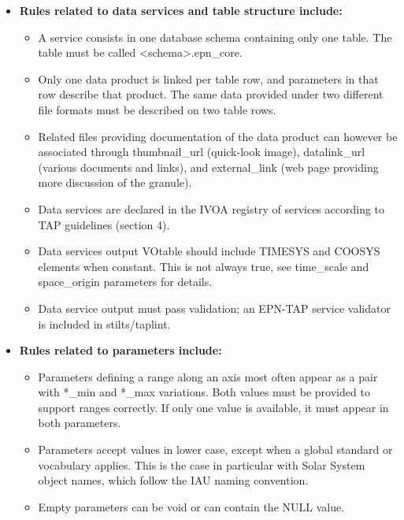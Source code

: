 \documentclass[11pt,a4paper]{ivoa}
\begin{document}
\begin{itemize}
\item \textbf{Rules related to data services and table structure include:}

\begin{itemize}
\item 
A service consists in one database schema containing only one table. The table must be called <schema>.epn\_core. 

\item Only one data product is linked per table row, and parameters in that row describe that product. The same data provided under two different file formats must be described on two table rows.

\item Related files providing documentation of the data product can however be associated through thumbnail\_{url} (quick-look image), datalink\_url (various documents and links), and external\_link (web page providing more discussion of the granule).

\item Data services are declared in the IVOA registry of services according to TAP guidelines (section 4).

\item Data services output VOtable should include TIMESYS and COOSYS elements when constant. This is not always true, see time\_scale  and space\_origin parameters for details.

\item Data service output must pass validation; an EPN-TAP service validator is included in stilts/taplint.
\end{itemize}


\item \textbf{Rules related to parameters include:}

\begin{itemize}
\item Parameters defining a range along an axis most often appear as a pair with *\_min and *\_max variations.
Both values must be provided to support ranges correctly. If only one value is available, it must appear in both parameters.


\item Parameters accept values in lower case, except when a global standard or vocabulary applies. This is the case in particular with Solar System object names, which follow the IAU naming convention. 

\item Empty parameters can be void or can contain the NULL value. 


\end{itemize}
\end{itemize}
\end{document}

